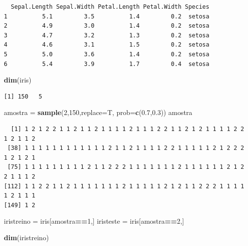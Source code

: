 \documentclass[12pt,brazil,oneside]{book}
\newenvironment{Shaded}{\begin{snugshade}}{\end{snugshade}}
\newcommand{\DataTypeTok}[1]{\textcolor[rgb]{0.13,0.29,0.53}{#1}}
\newcommand{\DecValTok}[1]{\textcolor[rgb]{0.00,0.00,0.81}{#1}}
\newcommand{\FloatTok}[1]{\textcolor[rgb]{0.00,0.00,0.81}{#1}}
\newcommand{\KeywordTok}[1]{\textcolor[rgb]{0.13,0.29,0.53}{\textbf{#1}}}
\newcommand{\NormalTok}[1]{#1}
\newcommand{\OperatorTok}[1]{\textcolor[rgb]{0.81,0.36,0.00}{\textbf{#1}}}
\newcommand{\StringTok}[1]{\textcolor[rgb]{0.31,0.60,0.02}{#1}}
\begin{document}
\begin{verbatim}
  Sepal.Length Sepal.Width Petal.Length Petal.Width Species
1          5.1         3.5          1.4         0.2  setosa
2          4.9         3.0          1.4         0.2  setosa
3          4.7         3.2          1.3         0.2  setosa
4          4.6         3.1          1.5         0.2  setosa
5          5.0         3.6          1.4         0.2  setosa
6          5.4         3.9          1.7         0.4  setosa
\end{verbatim}

\begin{Shaded}
\begin{Highlighting}[]
\KeywordTok{dim}\NormalTok{(iris)}
\end{Highlighting}
\end{Shaded}

\begin{verbatim}
[1] 150   5
\end{verbatim}

\begin{Shaded}
\begin{Highlighting}[]
\NormalTok{amostra =}\StringTok{ }\KeywordTok{sample}\NormalTok{(}\DecValTok{2}\NormalTok{,}\DecValTok{150}\NormalTok{,}\DataTypeTok{replace=}\NormalTok{T, }\DataTypeTok{prob=}\KeywordTok{c}\NormalTok{(}\FloatTok{0.7}\NormalTok{,}\FloatTok{0.3}\NormalTok{))}
\NormalTok{amostra}
\end{Highlighting}
\end{Shaded}

\begin{verbatim}
  [1] 1 2 1 2 2 1 1 2 1 1 2 1 1 1 1 2 1 1 1 2 2 1 1 2 1 2 1 1 1 1 2 2 1 2 1 1 2
 [38] 1 1 1 1 1 1 1 1 1 1 1 1 2 1 1 2 1 1 1 1 2 2 1 1 1 1 1 2 1 2 2 2 1 2 1 2 1
 [75] 1 1 1 1 1 1 1 1 1 2 1 1 2 2 2 1 1 1 1 1 1 1 2 1 1 1 1 1 1 2 1 2 2 1 1 1 2
[112] 1 1 2 2 1 1 2 1 1 1 1 1 1 1 2 1 1 1 1 1 2 1 2 1 1 2 2 2 1 1 1 1 1 2 1 1 1
[149] 1 2
\end{verbatim}

\begin{Shaded}
\begin{Highlighting}[]
\NormalTok{iristreino =}\StringTok{ }\NormalTok{iris[amostra}\OperatorTok{==}\DecValTok{1}\NormalTok{,]}
\NormalTok{iristeste =}\StringTok{ }\NormalTok{iris[amostra}\OperatorTok{==}\DecValTok{2}\NormalTok{,]}

\KeywordTok{dim}\NormalTok{(iristreino)}
\end{Highlighting}
\end{Shaded}
\end{document}
